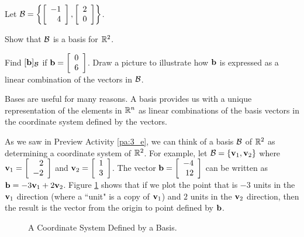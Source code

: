 \begin{pa}
Let $\mathcal{B} = \left\{ \left[ \begin{array}{r} -1 \\ 4 \end{array} \right], \left[ \begin{array}{c} 2 \\ 0 \end{array} \right]\right\}$. 
	\ba
	\item Show that $\mathcal{B}$ is a basis for $\mathbb{R}^2$. 

	\item Find $[\mathbf{b}]_{\mathcal{B}}$ if $\mathbf{b} =  \left[ \begin{array}{c} 0 \\ 6 \end{array} \right]$. Draw a picture to illustrate how $\mathbf{b}$ is expressed as a linear combination of the vectors in $\mathcal{B}$.


	\ea
	
\ee
\end{pa}




Bases are useful for many reasons. A basis provides us with a unique representation of the elements in $\mathbb{R}^n$ as linear combinations of the basis vectors in the coordinate system defined by the vectors. 

As we saw in Preview Activity \ref{pa:3_e}, we can think of a basis $\mathcal{B}$ of $\mathbb{R}^2$ as determining a coordinate system of $\mathbb{R}^2$. For example, let $\mathcal{B} = \{\mathbf{v}_1, \mathbf{v}_2\}$ where $\mathbf{v}_1 = \left[ \begin{array}{r} 2 \\ -2 \end{array} \right]$ and $\mathbf{v}_2 = \left[ \begin{array}{c} 1 \\ 3 \end{array} \right]$. The vector $\mathbf{b} =  \left[ \begin{array}{r} -4 \\ 12 \end{array} \right]$ can be written as $\mathbf{b} = -3\mathbf{v}_1 + 2\mathbf{v}_2$. Figure \ref{F:3_e_1} shows that if we plot the point that is $-3$ units in the $\mathbf{v}_1$ direction (where a ``unit" is a copy of $\mathbf{v}_1$) and $2$ units in the $\mathbf{v}_2$ direction, then the result is the vector from the origin to point defined by $\mathbf{b}$.
\begin{figure}[h]
\begin{center}
\end{center}
\caption{A Coordinate System Defined by a Basis.}
\label{F:3_e_1}
\end{figure}


